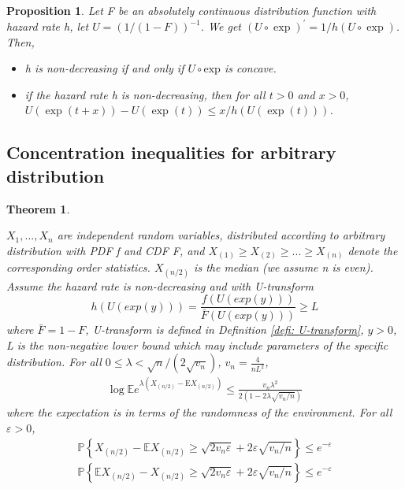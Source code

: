\documentclass{article}
\theoremstyle{plain}
\newtheorem{theo}{Theorem}
\newtheorem{prop}{Proposition}
\begin{document}
\begin{prop}
\label{prop non-increasing hazard rate}
Let F be an absolutely continuous distribution function with hazard
rate h, let $U=(1 /(1-F))^{-1}$. We get $(U \circ \exp )^{\prime}=1 / h(U \circ \exp )$. Then, 
\begin{itemize}
    \item h is non-decreasing if and only if $U \circ \mathrm{exp}$ is concave.
    \item if the hazard rate h is non-decreasing, then for all $t > 0$ and $x > 0$, $U(\exp (t+x))-U(\exp (t)) \leq x / h(U(\exp (t)))$.
\end{itemize}
\end{prop}
\subsection{Concentration inequalities for arbitrary distribution}

\begin{theo}
\label{theo: Concentration inequalities for arbitrary distribution}

$X_1, ..., X_n$ are independent random variables, distributed according to arbitrary distribution with PDF f and CDF F, and $X_{(1)} \geq X_{(2)} \geq ... \geq X_{(n)}$ denote the corresponding order statistics. $X_{(n/2)}$ is the median (we assume n is even). Assume the hazard rate is non-decreasing and with U-transform
$$h\left(U(exp(y))\right) = \frac{f\left(U(exp(y))\right)}{\bar{F}\left(U(exp(y))\right) } \geq L$$
where $\bar{F} = 1 - F$, U-transform is defined in Definition \ref{defi: U-transform}, $y > 0$, L is the non-negative lower bound which may include parameters of the specific distribution. For all $0 \leq \lambda< \sqrt{n} /\left(2 \sqrt{v_{n}}\right)$, $v_n = \frac{4}{n L^2}$,
\begin{align}
    \label{log inequality for arb}
    \log \mathbb{E}e^{\lambda\left(X_{(n / 2)}-\mathrm{E} X_{(n / 2)}\right)} \leq \frac{v_{n} \lambda^{2}}{2\left(1-2 \lambda \sqrt{v_{n} / n}\right)}
\end{align}
where the expectation is in terms of the randomness of the environment. For all $\varepsilon > 0$,
\begin{align} 
    \label{inequality Bernstein upper bound for abr}
    \mathbb{P}\left\{X_{(n / 2)}-\mathbb{E} X_{(n / 2)} \geq \sqrt{2 v_{n} \varepsilon}+2 \varepsilon \sqrt{v_{n} / n}\right\} \leq e^{-\varepsilon}\\
    \label{inequality Bernstein lower bound for abr}
    \mathbb{P}\left\{\mathbb{E} X_{(n / 2)} - X_{(n / 2)} \geq \sqrt{2 v_{n} \varepsilon}+2 \varepsilon \sqrt{v_{n} / n}\right\} \leq e^{-\varepsilon}
\end{align}
\end{theo}
\end{document}
